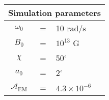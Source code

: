 \begin{tabular}{ccl}
\multicolumn{3}{c}{Simulation parameters} \\
\hline
$\omega_0$  &=& 10 rad/s\\
$B_0$  &=& $10^{13}$ G \\
$\chi$  &=& 50$^{\circ}$ \\
$a_0$ &=& 2$^{\circ}$ \\
$\mathcal{A}_{\mathrm{EM}}$ &= & ${4.3}{\times} 10^{-6}$
\end{tabular}
